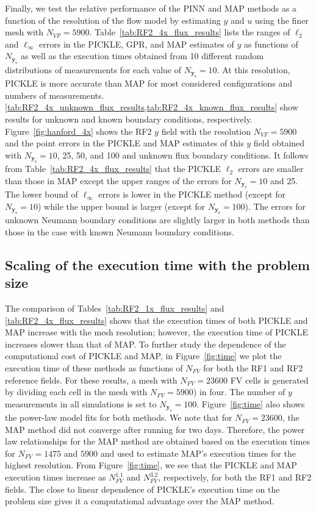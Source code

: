\documentclass{agujournal2019}
\begin{document}
Finally, we test the relative performance of the PINN and MAP methods as a function of the resolution of the flow model by estimating $y$ and $u$ using the finer mesh with $N_{VF} = 5900$.
Table~\ref{tab:RF2_4x_flux_results} lists the ranges of $\ell_2$ and $\ell_\infty$ errors in the PICKLE, GPR, and MAP estimates of $y$ as functions of $N_{\mathbf{y}_{\mathrm{s}}}$ as well as the execution times obtained from 10 different random distributions of measurements for each value of $N_{\mathbf{y}_{\mathrm{s}}}=10$. At this resolution,  PICKLE is more accurate than MAP for most considered configurations and numbers of measurements.  \cref{tab:RF2_4x_unknown_flux_results,tab:RF2_4x_known_flux_results} show results for unknown and known boundary conditions, respectively.  
Figure~\ref{fig:hanford_4x} shows the RF2 $y$ field with the resolution $N_{VF} = 5900$ and the point errors in the PICKLE and MAP estimates of this $y$ field obtained with $N_{\mathbf{y}_{\mathrm{s}}}=10$, 25, 50, and 100 and unknown flux boundary conditions.
It follows from Table~\ref{tab:RF2_4x_flux_results} that 
the PICKLE $\ell_2$ errors are smaller than those in MAP except the upper ranges of the errors for $N_{\mathbf{y}_{\mathrm{s}}}=10$ and 25. The lower bound of $\ell_\infty$ errors is lower in the PICKLE method (except for $N_{\mathbf{y}_{\mathrm{s}}}=10$) while  the upper bound is larger (except for $N_{\mathbf{y}_{\mathrm{s}}}=100$). The errors for unknown Neumann boundary conditions are slightly larger in both methods than those in the case with known Neumann boundary conditions.

 
\subsection{Scaling of the execution time with the problem size} 
The comparison of Tables~\ref{tab:RF2_1x_flux_results} and \ref{tab:RF2_4x_flux_results} shows that 
the execution times of both PICKLE and MAP increase with the mesh resolution; however, the execution time of PICKLE increases slower than that of MAP.
To further study the dependence of the computational cost of  PICKLE and MAP, in Figure~\ref{fig:time} we plot the execution time of these methods as functions of $N_{FV}$ for both the RF1 and RF2 reference fields.  For these results, a mesh with  $N_{FV}=23600$ FV cells is generated by dividing each cell in the mesh with $N_{FV}=5900$) in four. The number of $y$ measurements in all simulations is set to  $N_{\mathbf{y}_{\mathrm{s}}}=100$.
Figure~\ref{fig:time} also shows the power-law model fits for both methods. We note that for $N_{FV}=23600$, the MAP method did not converge after running for two days. Therefore, the power law relationships for the MAP method are obtained based on the execution times for $N_{FV}=1475$ and $5900$ and used to estimate MAP's execution times for the highest resolution. 
From Figure~\ref{fig:time}, we see that the PICKLE and MAP execution times increase as $N_{FV}^{1.1}$ and $N_{FV}^{3.2}$, respectively, for both the RF1 and RF2 fields.
The close to linear dependence of PICKLE's execution time on the problem size gives it a computational advantage over the MAP method. 
\end{document}

